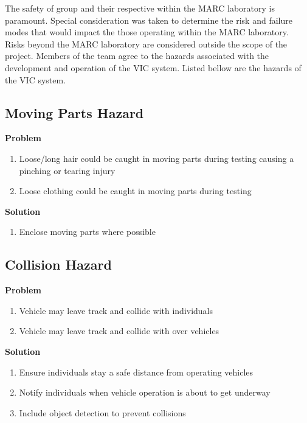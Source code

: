 \documentclass [10pt]{article}
\begin{document}
The safety of group and their respective within the MARC laboratory is paramount. Special consideration was taken to determine the risk and failure modes that would impact the those operating within the MARC laboratory. Risks beyond the MARC laboratory are considered outside the scope of the project. Members of the team agree to the hazards associated with the development and operation of the VIC system. Listed bellow are the hazards of the VIC system. 


\subsection{Moving Parts Hazard}

\textbf{Problem}
\begin{enumerate}[label = - , leftmargin=.3in]
        \item Loose/long hair could be caught in moving parts during testing causing a pinching or tearing injury
        \item  Loose clothing could be caught in moving parts during testing\vspace{1mm}
    \end{enumerate}

\textbf{Solution}

\begin{enumerate}[label = - , leftmargin=.3in]
        \item Enclose moving parts where possible
    \end{enumerate}




\subsection{Collision Hazard}
\textbf{Problem}
\begin{enumerate}[label = - , leftmargin=.3in]
        \item Vehicle may leave track and collide with individuals 
        \item Vehicle may leave track and collide with over vehicles 
    \end{enumerate}

\textbf{Solution}

\begin{enumerate}[label = - , leftmargin=.3in]
        \item Ensure individuals stay a safe distance from operating vehicles 
        \item Notify individuals when vehicle operation is about to get underway
        \item Include object detection to prevent collisions
        
    \end{enumerate}
\end{document}
